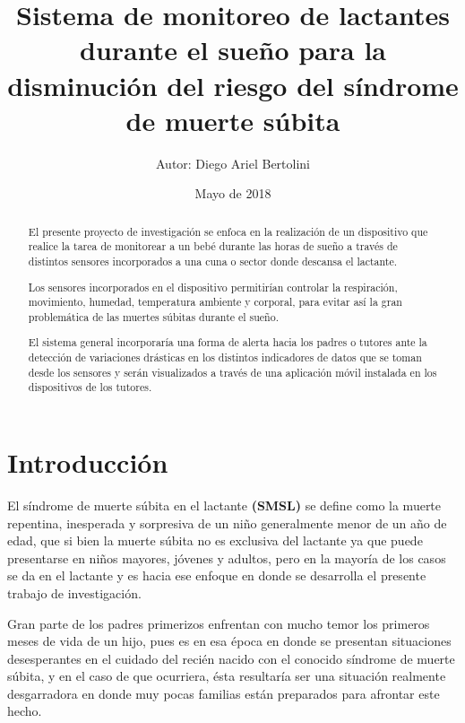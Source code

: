 \documentclass{IEEEtran}
\begin{document}
	\title{Sistema de monitoreo de lactantes durante el sueño para la disminución del riesgo del síndrome de muerte súbita}
	\author{Autor: Diego Ariel Bertolini}
	\date{Mayo de 2018}	
	\maketitle

	
	\begin{abstract}
		El presente proyecto de investigación se enfoca en la realización de un dispositivo que realice la tarea de monitorear a un bebé durante las horas de sueño a través de distintos sensores incorporados a una cuna o sector donde descansa el lactante. 

		Los sensores incorporados en el dispositivo permitirían controlar la respiración, movimiento, humedad, temperatura ambiente y corporal, para evitar así la gran problemática de las muertes súbitas durante el sueño.
		
		El sistema general incorporaría una forma de alerta hacia los padres o tutores ante la detección de variaciones drásticas en los distintos indicadores de datos que se toman desde los sensores y serán visualizados a través de una aplicación móvil instalada en los dispositivos de los tutores.
	\end{abstract}
	
	\section{Introducción}
	

	
		El síndrome de muerte súbita en el lactante \textbf{(SMSL)} se define como la muerte repentina, inesperada y sorpresiva de un niño generalmente menor de un año de edad, que si bien la muerte súbita no es exclusiva del lactante ya que puede presentarse en niños mayores, jóvenes y adultos, pero en la mayoría de los casos se da en el lactante y es hacia ese enfoque en donde se desarrolla el presente trabajo de investigación. 

		Gran parte de los padres primerizos enfrentan con mucho temor los primeros meses de vida de un hijo, pues es en esa época en donde se presentan situaciones desesperantes en el cuidado del recién nacido con el conocido síndrome de muerte súbita, y en el caso de que ocurriera, ésta resultaría ser una situación realmente desgarradora en donde muy pocas familias están preparados para afrontar este hecho.
\end{document}
